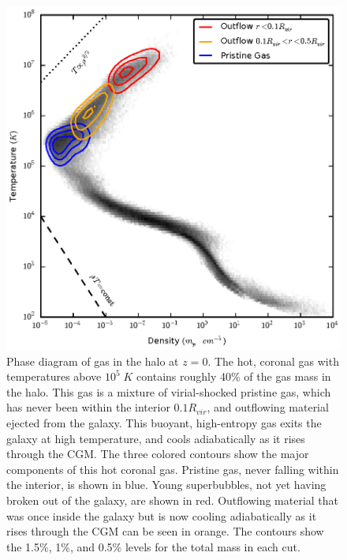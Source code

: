 \begin{figure}
    \includegraphics[width=\textwidth]{figures2/phase.eps}
    \caption[Gas phase diagram for g1536]{Phase diagram of gas in the halo at $z=0$.  The hot, coronal gas
        with temperatures above $10^5\;K$ contains roughly 40\% of the gas mass
        in the halo.  This gas is a mixture of virial-shocked pristine gas,
        which has never been within the interior $0.1R_{vir}$, and outflowing
        material ejected from the galaxy.  This buoyant, high-entropy gas exits
        the galaxy at high temperature, and cools adiabatically as it rises
        through the CGM.  The three colored contours show the major components
        of this hot coronal gas.  Pristine gas, never falling within the
        interior, is shown in blue.  Young superbubbles, not yet having broken out
        of the galaxy, are shown in red.  Outflowing material that was once inside the
        galaxy but is now cooling adiabatically as it rises through the CGM can be seen
        in orange.  The contours show the 1.5\%, 1\%, and 0.5\% levels for the
        total mass in each cut.}
        \label{phase}
\end{figure}

